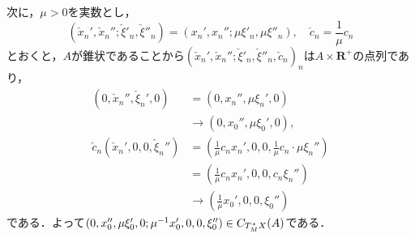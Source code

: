 \documentclass[leqno, 10pt, a4paper, dvipdfmx]{jsarticle}
\makeatletter
\theoremstyle{definition}
\newcommand{\rr}{\mathbf{R}}
\renewenvironment{proof}[1][\proofname]{\par
  \pushQED{\qed}%
  \normalfont \topsep6\p@\@plus6\p@\relax
  \trivlist
  \item[\hskip\labelsep
         \bfseries
    {#1}]\ignorespaces
}{%
  \popQED\endtrivlist\@endpefalse
}
\renewcommand{\proofname}{証明.}
\numberwithin{equation}{section}
\newcommand{\rrp}{\rr^{+}} %
\theoremstyle{mystyle}
\newcommand{\conm}[2][]{T_{#1}^{\hspace{0.7pt}\ast}{#2}}
\newcommand{\wncone}[1][]{C_{#1}} %
\makeatother
\begin{document}
\begin{proof}
    次に，\(\mu>0\)を実数とし，\[
        \left(\check{x}_n',\check{x}_n'';\check{\xi}'_n,\check{\xi}''_n\right)
        =
        \left(x_n',x_n'';\mu\xi'_n,\mu\xi''_n\right),
        \quad 
        \check{c}_n=\frac{1}{\mu} c_n
    \]
    とおくと，\(A\)が錐状であることから\(\left(
        \check{x}_n',\check{x}_n'';\check{\xi}'_n,\check{\xi}''_n,
        \check{c}_n
    \right)_n\)は\(A\times \rrp\)の点列であり，
    \begin{align*}
        (0,\check{x}_n'',\check{\xi}_n',0)
        &=(0,x_n'',\mu\xi_n',0)\\
        &\to(0,x_0'',\mu\xi_0',0),\\
        \check{c}_n(\check{x}_n',0,0,\check{\xi}_n'')
        &=\left(\frac{1}{\mu}c_n x_n',0,0,\frac{1}{\mu}c_n\cdot \mu\xi_n''\right)\\
        &=\left(\frac{1}{\mu}c_n x_n',0,0,c_n\xi_n''\right)\\&\to\left(\frac{1}{\mu} x_0',0,0,\xi_0''\right)
    \end{align*}
    である．よって\(
        (0,x_0'',\mu\xi_0',0;\mu^{-1}x_0',0,0,\xi_0'')
        \in\wncone[{\conm[M]{X}}](A)
    \)である．
\end{proof}

\appendix
\end{document}
